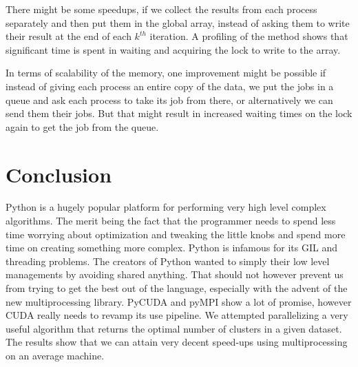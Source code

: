 \documentclass[10pt,twocolumn,letterpaper]{article}
\begin{document}
There might be some speedups, if we collect the results from each
process separately and then put them in the global array, instead
of asking them to write their result at the end of each $k^{th}$ iteration.
A profiling of the method shows that significant time is spent in
waiting and acquiring the lock to write to the array.

In terms of scalability of the memory, one improvement might be possible
if instead of giving each process an entire copy of the data, we put
the jobs in a queue and ask each process to take its job from there,
or alternatively we can send them their jobs. But that might result
in increased waiting times on the lock again to get the job from the
queue.


\section{Conclusion} \label{conclusion}

Python is a hugely popular platform for performing very high level
complex algorithms. The merit being the fact that the programmer needs
to spend less time worrying about optimization and tweaking the little
knobs and spend more time on creating something more complex. Python
is infamous for its GIL and threading problems. The creators of Python
wanted to simply their low level managements by avoiding shared anything.
That should not however prevent us from trying to get the best out
of the language, especially with the advent of the new multiprocessing
library. PyCUDA and pyMPI show a lot of promise, however CUDA really
needs to revamp its use pipeline. We attempted parallelizing a very
useful algorithm that returns the optimal number of clusters in a
given dataset. The results show that we can attain very decent speed-ups using multiprocessing on an average machine.

\onecolumn
\clearpage
{\small


}
\end{document}
